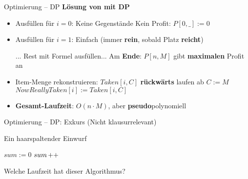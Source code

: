 \begin{frame}[t]{Optimierung – DP}
	\vspace{-.5\baselineskip}
	\textbf{Lösung von \Knapsack mit DP} 
	\begin{itemize}
		\implitem Erinnerung: \\ \vspace{-\baselineskip}
		\quad $P[i, C] = \max\left(\overbrace{P[i-1, C]}^\text{Nehmen $i$ nicht}, \ \underbrace{P[i-1, C - w_i] + p_i}_\text{Nehmen Gegenstand $i$ mit}\right)$ 
		\forcenewline
		\forcenewline
		\item Ausfüllen für $i = 0$: Keine Gegenstände \impl Kein Profit: $P[0, \_] := 0$
		\pause
		\item Ausfüllen für $i = 1$: Einfach (immer \textbf{rein}, sobald Platz \textbf{reicht})
		\pause
		\item[...] Rest mit Formel ausfüllen...
		\implitem Am \textbf{Ende}: $P[n, M]$ gibt \textbf{maximalen} Profit an 
		\pause
		\item Item-Menge rekonstruieren: $Taken[i, C]$ \textbf{rückwärts} laufen ab $C := M$ \\
		\quad $NowReallyTaken[i] := Taken[i, C]$ \\
		\quad {}
		\item \textbf{Gesamt-Laufzeit}: $O(n \cdot M)$, aber \textbf{pseudo}polynomiell 
	\end{itemize}
\end{frame}

\begin{frame}{Optimierung – DP: Exkurs {\footnotesize (Nicht klausurrelevant)}}
	\begin{exampleblock}{Ein haarspaltender Einwurf}
		\begin{algorithm}[H]
			 {
				$sum := 0$\;
				 {
					$sum\operatorname{++}$\;
				}
			}
		\end{algorithm}
	\end{exampleblock}
	Welche Laufzeit hat dieser Algorithmus?
\end{frame}

